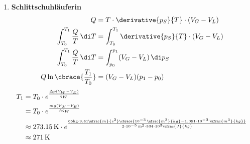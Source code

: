 \documentclass[11pt,letterpaper]{article}
\begin{document}
\begin{enumerate}
    \item \textbf{Schlittschuhläuferin}
        \begin{align*}
            Q &= T\cdot \derivative{p_S}{T} \cdot (V_G - V_L)\\
            \int_{T_0}^{T_1} \frac{Q}{T} \,\di T&= \int_{T_0}^{T_1} \derivative{p_S}{T} \cdot (V_G - V_L)\\
            \int_{T_0}^{T_1} \frac{Q}{T} \,\di T &= \int_{p_0}^{p_1}(V_G - V_L)\, \di p_S\\
             Q \ln\cbrace{\frac{T_1}{T_0}} &= (V_G - V_L)(p_1 - p_0)
        \end{align*}
        \newpage
        \begin{align*}
            T_{1} &= T_{0} \cdot e^{\frac{\Delta p (V_W - V_E)}{q_W}}\\
            &= T_{0} \cdot e^{\frac{m g (V_W - V_E)}{A q_W}}\\
            &\approx 273.15 \,\mathrm{K} \cdot e^{\frac{65\mathrm{kg} \cdot 9.81 \ufrac{m}{s^2} \cbrace{10^{-3}\,\ufrac{m^3}{kg} - 1.091\cdot10^{-3}\,\ufrac{m^3}{kg}}}{2\cdot 10^{-5} \,\mathrm{m^2}\cdot 334\cdot 10^{3} \ufrac{J}{kg}}}\\
            &\approx 271 \,\mathrm{K}\\
        \end{align*}


\end{enumerate}
\end{document}
